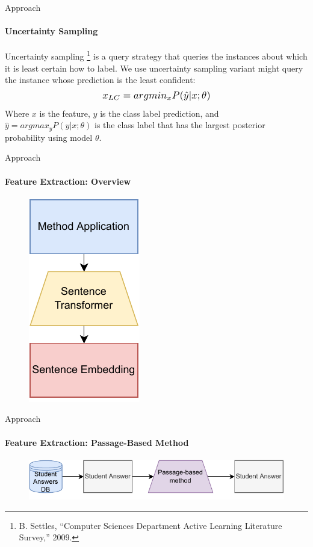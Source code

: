 \documentclass[aspectratio=169]{beamer}
\begin{document}
\begin{frame}{Approach}
\framesubtitle{Uncertainty Sampling}
Uncertainty sampling \footnote{\footnotesize\tiny B. Settles, “Computer Sciences Department Active Learning Literature Survey,” 2009.} is a query strategy that queries the instances about which it is least certain how to label. We use uncertainty sampling variant might query the instance whose prediction is the least confident:
\begin{equation}
\label{equation:uncertainty sampling}
\scalebox{1.2}{$x_{LC} = argmin_{x} P({\hat{y}|x;\theta})$}
\end{equation}
Where $x$ is the feature, $y$ is the class label prediction, and $\hat{y} = argmax_y P({y|x;\theta})$ is the class label that has the largest posterior probability using model $\theta$.
\end{frame}
\begin{frame}{Approach}
\framesubtitle{Feature Extraction: Overview}
\begin{figure}
	\centering
	\includegraphics[scale = 0.65]{images/feature_extraction.pdf}
	\label{fig:feature extraction}
\end{figure}
\end{frame}
\begin{frame}{Approach}
\framesubtitle{Feature Extraction: Passage-Based Method}
\begin{figure}
	\centering
	\includegraphics[scale = 1]{images/passage_FE_slides.pdf}
	\label{fig:passage fe slides}
\end{figure}
\end{frame}
\end{document}
